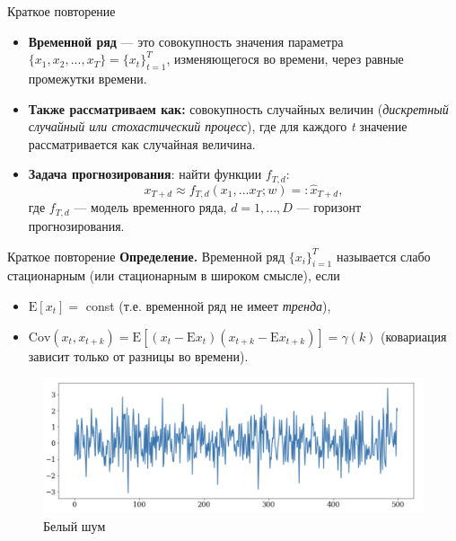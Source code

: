 
\usepackage{tikz}
\usepackage{amsmath}
\usepackage[english,russian]{babel}
\usepackage[labelformat=empty]{caption}

\usepackage{csquotes}

\usetikzlibrary{arrows,shapes,positioning,shadows,trees}
\newcommand*{\defeq}{\stackrel{\text{def}}{=}}


\begin{frame}
\titlepage
\end{frame}
\begin{frame}{Краткое повторение}
\begin{itemize}
\item \textbf{Временной ряд} --- это совокупность значения параметра $\{x_1, x_2,...,x_T\}= \{ x_t \}_{t=1}^T$, изменяющегося во времени,  через равные промежутки времени.
\item \textbf{Также рассматриваем как:} совокупность случайных величин (\textit{дискретный случайный или стохастический процесс}), где для каждого \textit{t} значение рассматривается как случайная величина.
\item \textbf{Задача прогнозирования}: найти функции $f_{T,d}$:
\begin{equation*}
x_{T+d} \approx f_{T,d}(x_1,...x_T;w) =: \hat{x}_{T+d}, 
\end {equation*}
где $f_{T,d}$ --- модель временного ряда, $d =1,...,D$ --- горизонт прогнозирования.
\end{itemize}

\end{frame}
\begin{frame}{Краткое повторение}
\textbf{Определение.} Временной ряд $\{x_i\}_{i=1}^{T}$ называется слабо стационарным (или стационарным в широком смысле), если
\begin{itemize}
    \item $\mathrm{E}[x_t]=$ const (т.е. временной ряд не имеет \textit{тренда}),
    \item $\mathrm{Cov}(x_t,x_{t+k}) = \mathrm{E}[(x_t - \mathrm{E}x_t)(x_{t+k} - \mathrm{E}x_{t+k})] = \gamma(k)$ (ковариация зависит только от разницы во времени).
\end{itemize}
\begin{figure}
    \centering
    \includegraphics[width=0.9\linewidth]{lecture_3/fig/noise.png}
    \caption{Белый шум}
\end{figure}
\end{frame}
